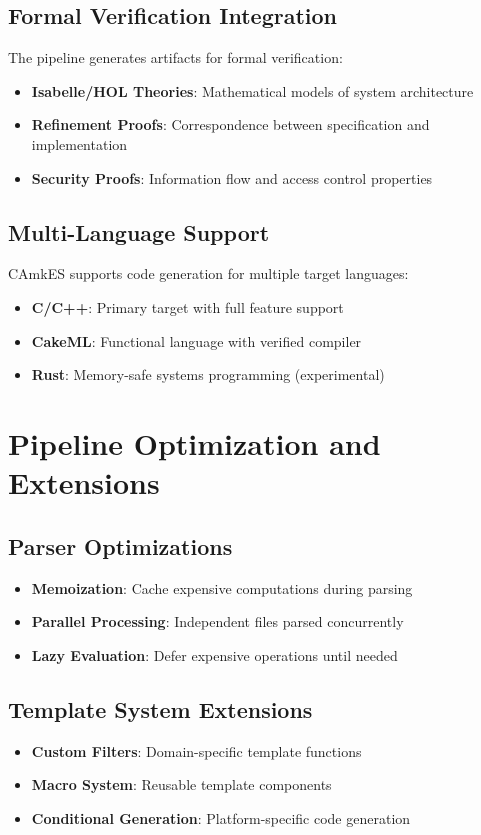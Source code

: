 \documentclass[12pt,a4paper]{article}
\begin{document}
\subsection{Formal Verification Integration}
The pipeline generates artifacts for formal verification:

\begin{itemize}
    \item \textbf{Isabelle/HOL Theories}: Mathematical models of system architecture
    \item \textbf{Refinement Proofs}: Correspondence between specification and implementation
    \item \textbf{Security Proofs}: Information flow and access control properties
\end{itemize}

\subsection{Multi-Language Support}
CAmkES supports code generation for multiple target languages:

\begin{itemize}
    \item \textbf{C/C++}: Primary target with full feature support
    \item \textbf{CakeML}: Functional language with verified compiler
    \item \textbf{Rust}: Memory-safe systems programming (experimental)
\end{itemize}

\section{Pipeline Optimization and Extensions}

\subsection{Parser Optimizations}
\begin{itemize}
    \item \textbf{Memoization}: Cache expensive computations during parsing
    \item \textbf{Parallel Processing}: Independent files parsed concurrently
    \item \textbf{Lazy Evaluation}: Defer expensive operations until needed
\end{itemize}

\subsection{Template System Extensions}
\begin{itemize}
    \item \textbf{Custom Filters}: Domain-specific template functions
    \item \textbf{Macro System}: Reusable template components
    \item \textbf{Conditional Generation}: Platform-specific code generation
\end{itemize}
\end{document}
